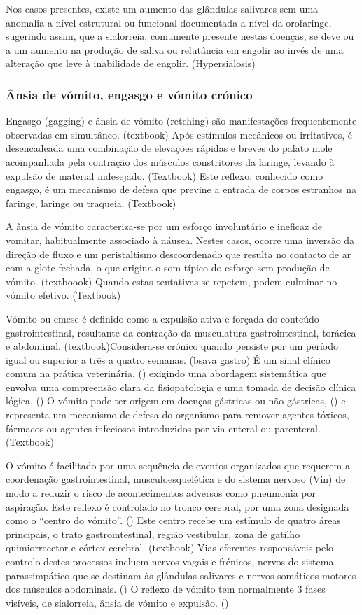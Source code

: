 Nos casos presentes, existe um aumento das glândulas salivares sem uma anomalia a nível estrutural ou funcional documentada a nível da orofaringe, sugerindo assim, que a sialorreia, comumente presente nestas doenças, se deve ou a um aumento na produção de saliva ou relutância em engolir ao invés de uma alteração que leve à inabilidade de engolir. (Hypersialosis)

\subsubsection{Ânsia de vómito, engasgo e vómito crónico}

Engasgo (gagging) e ânsia de vómito (retching) são manifestações frequentemente observadas em simultâneo. (textbook) 
Após estímulos mecânicos ou irritativos, é desencadeada uma combinação de elevações rápidas e breves do palato mole acompanhada pela contração dos músculos constritores da laringe, levando à expulsão de material indesejado. (Textbook) Este reflexo, conhecido como engasgo, é um mecanismo de defesa que previne a entrada de corpos estranhos na faringe, laringe ou traqueia. (Textbook)


A ânsia de vómito caracteriza-se por um esforço involuntário e ineficaz de vomitar, habitualmente associado à náusea. Nestes casos, ocorre uma inversão da direção de fluxo e um peristaltismo descoordenado que resulta no contacto de ar com a glote fechada, o que origina o som típico do esforço sem produção de vómito. (textboook) Quando estas tentativas se repetem, podem culminar no vómito efetivo. (Textbook)


Vómito ou emese é definido como a expulsão ativa e forçada do conteúdo gastrointestinal, resultante da contração da musculatura gastrointestinal, torácica e abdominal. (textbook)Considera-se crónico quando persiste por um período igual ou superior a três a quatro semanas. (bsava gastro) É um sinal clínico comum na prática veterinária, (\cite{Dixit2022}) exigindo uma abordagem sistemática que envolva uma compreensão clara da fisiopatologia e uma tomada de decisão clínica lógica. (\cite{Elwood2010}) O vómito pode ter origem em doenças gástricas ou não gástricas, (\cite{McGrotty2010}) e representa um mecanismo de defesa do organismo para remover agentes tóxicos, fármacos ou agentes infeciosos introduzidos por via enteral ou parenteral. (Textbook)


O vómito é facilitado por uma sequência de eventos organizados que requerem a coordenação gastrointestinal, musculoesquelética e do sistema nervoso (Vin) de modo a reduzir o risco de acontecimentos adversos como pneumonia por aspiração. Este reflexo é controlado no tronco cerebral, por uma zona designada como o “centro do vómito”. (\cite{Elwood2010}) Este centro recebe um estímulo de quatro áreas principais, o trato gastrointestinal, região vestibular, zona de gatilho quimiorrecetor  e córtex cerebral. (textbook) Vias eferentes responsáveis pelo controlo destes processos incluem nervos vagais e frénicos, nervos do sistema parassimpático que se destinam às glândulas salivares e nervos somáticos motores dos músculos abdominais. (\cite{Elwood2010}) O reflexo de vómito tem normalmente 3 fases visíveis, de sialorreia, ânsia de vómito e expulsão. (\cite{Elwood2010}) 



